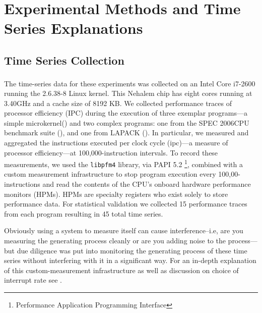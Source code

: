 \section{Experimental Methods and Time Series Explanations}\label{sec:methods}



\subsection{Time Series Collection}

The time-series data for these experiments was collected on an Intel Core\textsuperscript{\textregistered} i7-2600 running the 2.6.38-8 Linux
kernel.  This Nehalem chip has eight cores running at 3.40GHz and a cache size
of 8192 KB.  We collected performance traces of processor efficiency (IPC) during the execution of three exemplar programs---a simple microkernel(\col) and two complex programs: one from the
SPEC 2006CPU benchmark suite (\gcc), and one from LAPACK (\svd). In particular, we measured and aggregated the instructions executed per clock cycle (ipc)---a measure of processor efficiency---at 100,000-instruction intervals.  To record these measurements,
we used the {\tt libpfm4} library, via PAPI 5.2
\footnote{Performance Application Programming Interface}\cite{papi}, combined with a custom measurement infrastructure\cite{todd-phd} to stop program execution every 100,00-instructions and read the contents of the CPU's onboard hardware performance monitors (HPMs). HPMs are specialty registers who exist solely to store performance data.  For statistical validation we collected 15 performance traces from each program resulting in 45 total time series.


Obviously using a system to measure itself can cause interference--i.e, are you measuring the generating process cleanly or are you adding noise to the process---but due diligence was put into monitoring the generating process of these time series without interfering with it in a significant way. For an in-depth explanation of this custom-measurement infrastructure as well as discussion on choice of interrupt rate see 
\cite{zach-IDA10,mytkowicz09,todd-phd}.


